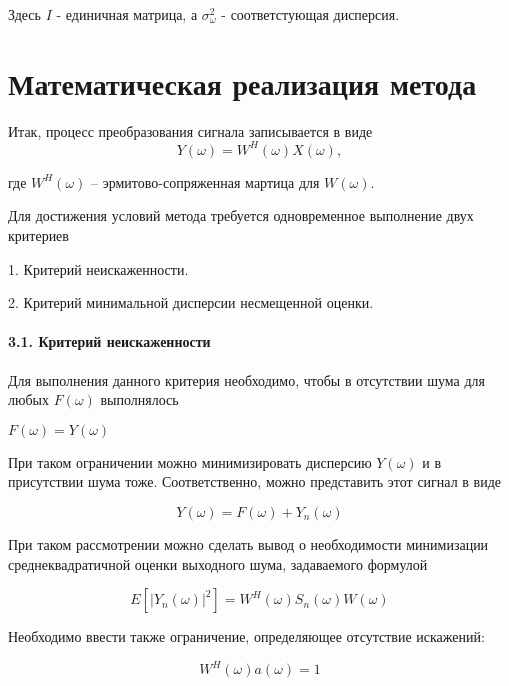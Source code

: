 \documentclass{article}
\begin{document}
Здесь $I$ - единичная матрица, а $\sigma_{\omega}^{2}$ - соответстующая дисперсия.

\section{Математическая реализация метода}

Итак, процесс преобразования сигнала записывается в виде
\begin{equation}
Y(\omega) = W^H(\omega)X(\omega),
\end{equation}

где $W^{H}(\omega)$ -- эрмитово-сопряженная мартица для $W(\omega)$.

Для достижения условий метода требуется одновременное выполнение двух критериев

1. Критерий неискаженности. \cite{Brown62}

2. Критерий минимальной дисперсии несмещенной оценки. \cite{Levin64}

\paragraph{3.1. Критерий неискаженности\\}
Для выполнения данного критерия необходимо, чтобы в отсутствии шума для любых $F(\omega)$ выполнялось

\begin{center}
$F(\omega) = Y(\omega)$
\end{center}

При таком ограничении можно минимизировать дисперсию $Y(\omega)$ и в присутствии шума тоже. Соответственно, можно представить этот сигнал в виде

\begin{equation}
Y(\omega) = F(\omega) + Y_{n}(\omega)
\end{equation}

При таком рассмотрении можно сделать вывод о необходимости минимизации среднеквадратичной оценки выходного шума, задаваемого формулой

\begin{equation}
E[|Y_{n}(\omega)|^{2}] = W^{H}(\omega)S_{n}(\omega)W(\omega)
\end{equation}

Необходимо ввести также ограничение, определяющее отсутствие искажений:

\begin{equation}
W^{H}(\omega)a(\omega) = 1
\end{equation}
\end{document}
